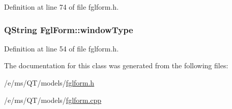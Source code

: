 Definition at line 74 of file fglform.h.

\hypertarget{classFglForm_a5262a92dfdf82913701d4661bbefaaac}{
\subsubsection[{windowType}]{\setlength{\rightskip}{0pt plus 5cm}QString FglForm::windowType}}
\label{classFglForm_a5262a92dfdf82913701d4661bbefaaac}


Definition at line 54 of file fglform.h.



The documentation for this class was generated from the following files:\begin{DoxyCompactItemize}
\item 
/e/ms/QT/models/\hyperlink{fglform_8h}{fglform.h}\item 
/e/ms/QT/models/\hyperlink{fglform_8cpp}{fglform.cpp}\end{DoxyCompactItemize}
